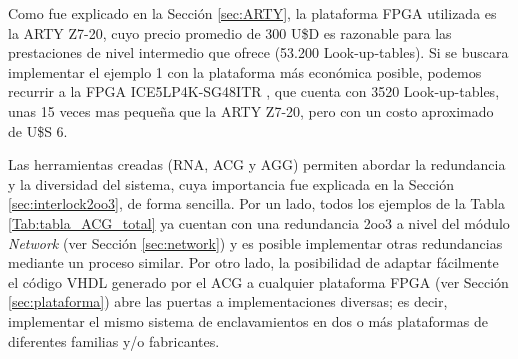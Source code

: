 	 Como fue explicado en la Sección \ref{sec:ARTY}, la plataforma FPGA utilizada es la ARTY Z7-20, cuyo precio promedio de 300 U\$D es razonable para las prestaciones de nivel intermedio que ofrece (53.200 Look-up-tables). Si se buscara implementar el ejemplo 1 con la plataforma más económica posible, podemos recurrir a la FPGA ICE5LP4K-SG48ITR \cite{LATTICE}, que cuenta con 3520 Look-up-tables, unas 15 veces mas pequeña que la ARTY Z7-20, pero con un costo aproximado de U\$S 6.
	 
	 
	 Las herramientas creadas (RNA, ACG y AGG) permiten abordar la redundancia y la diversidad del sistema, cuya importancia fue explicada en la Sección \ref{sec:interlock2oo3}, de forma sencilla. Por un lado, todos los ejemplos de la Tabla \ref{Tab:tabla_ACG_total} ya cuentan con una redundancia 2oo3 a nivel del módulo \textit{Network} (ver Sección \ref{sec:network}) y es posible implementar otras redundancias mediante un proceso similar. Por otro lado, la posibilidad de adaptar fácilmente el código VHDL generado por el ACG a cualquier plataforma FPGA (ver Sección \ref{sec:plataforma}) abre las puertas a implementaciones diversas; es decir, implementar el mismo sistema de enclavamientos en dos o más plataformas de diferentes familias y/o fabricantes.
	 
	 
	 
	 
	 
	 
	 
	